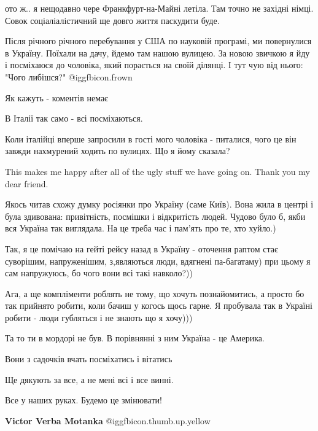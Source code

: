 \begin{itemize}
\begin{itemize}
ото ж.. я нещодавно чере Франкфурт-на-Майні летіла. Там точно не західні німці.
Совок соціаліалістичний ще довго життя паскудити буде.

\end{itemize} %


Після річного річного перебування у США по науковій програмі, ми повернулися в
Україну. Поїхали на дачу, йдемо там нашою вулицею. За новою звичкою я йду і
посміхаюся до чоловіка, який порається на своїй ділянці. І тут чую від нього:
"Чого либішся?"  @igg{fbicon.frown} 

Як кажуть - коментів немає


В Італії так само - всі посміхаються.

Коли італійці вперше запросили в гості мого чоловіка - питалися, чого це він
завжди нахмурений ходить по вулицях. Що я йому сказала?


This makes me happy after all of the ugly stuff we have going on. Thank you my dear friend.


Якось читав схожу думку росіянки про Україну (саме Київ). Вона жила в центрі і
була здивована: привітність, посмішки і відкритість людей. Чудово було б, якби
вся Україна так виглядала. На це треба час і пам'ять про те, хто хуйло.)


Так, я це помічаю на гейті рейсу назад в Україну - оточення раптом стає
суворішим, напруженішим, з,являються люди, вдягнені па-багатаму) при цьому я
сам напружуюсь, бо чого вони всі такі навколо?))



Ага, а ще компліменти роблять не тому, що хочуть познайомитись, а просто бо так
прийнято робити, коли бачиш у когось щось гарне. Я пробувала так в Україні
робити - люди губляться і не знають що я хочу)))


Та то ти в мордорі не був. В порівнянні з ним Україна - це Америка.

Вони з садочків вчать посміхатись і вітатись

Ще дякують за все, а не мені всі і все винні.

Все у наших руках. Будемо це змінювати!

\begin{itemize} %
\textbf{Victor Verba Motanka}  @igg{fbicon.thumb.up.yellow} 
\end{itemize} %


\end{itemize}
